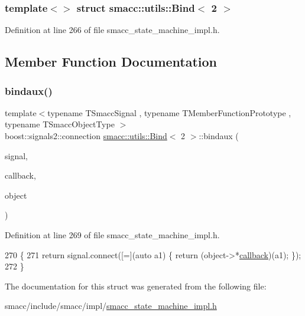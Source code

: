 \subsubsection*{template$<$$>$\newline
struct smacc\+::utils\+::\+Bind$<$ 2 $>$}



Definition at line 266 of file smacc\+\_\+state\+\_\+machine\+\_\+impl.\+h.



\subsection{Member Function Documentation}
\mbox{\label{structsmacc_1_1utils_1_1Bind_3_012_01_4_aa9bba43cc8862f00155b17d2625bd99e}} 
\subsubsection{\texorpdfstring{bindaux()}{bindaux()}}
{\footnotesize\ttfamily template$<$typename T\+Smacc\+Signal , typename T\+Member\+Function\+Prototype , typename T\+Smacc\+Object\+Type $>$ \\
boost\+::signals2\+::connection \hyperlink{structsmacc_1_1utils_1_1Bind}{smacc\+::utils\+::\+Bind}$<$ 2 $>$\+::bindaux (\begin{DoxyParamCaption}\item[{T\+Smacc\+Signal \&}]{signal,  }\item[{T\+Member\+Function\+Prototype}]{callback,  }\item[{T\+Smacc\+Object\+Type $\ast$}]{object }\end{DoxyParamCaption})\hspace{0.3cm}{\ttfamily [inline]}}



Definition at line 269 of file smacc\+\_\+state\+\_\+machine\+\_\+impl.\+h.


\begin{DoxyCode}
270       \{
271         \textcolor{keywordflow}{return} signal.connect([=](\textcolor{keyword}{auto} a1) \{ \textcolor{keywordflow}{return} (object->*\hyperlink{sm__ridgeback__barrel__search__1_2servers_2opencv__perception__node_2opencv__perception__node_8cpp_a050e697bd654facce10ea3f6549669b3}{callback})(a1); \});
272       \}
\end{DoxyCode}


The documentation for this struct was generated from the following file\+:\begin{DoxyCompactItemize}
\item 
smacc/include/smacc/impl/\hyperlink{smacc__state__machine__impl_8h}{smacc\+\_\+state\+\_\+machine\+\_\+impl.\+h}\end{DoxyCompactItemize}
